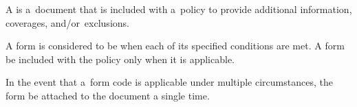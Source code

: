 
\incomplete
{}

A  is a~document that is included with a~policy to provide additional
information, coverages, and/or~exclusions.

A form is considered to be  when each of its specified
conditions are met. A form \shall be included with the policy only when it is
applicable.

In the event that a~form code is applicable under multiple circumstances, the
form \shall be attached to the document a single time.
